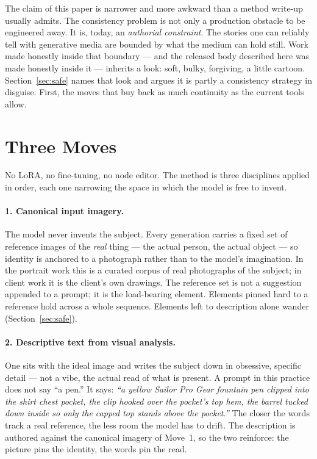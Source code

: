 \documentclass[10pt,letterpaper,twocolumn]{article}
\begin{document}
The claim of this paper is narrower and more awkward than a method write-up
usually admits. The consistency problem is not only a production obstacle
to be engineered away. It is, today, an \emph{authorial constraint}. The
stories one can reliably tell with generative media are bounded by what the
medium can hold still. Work made honestly inside that boundary --- and the
released body described here was made honestly inside it --- inherits a
look: soft, bulky, forgiving, a little cartoon. Section~\ref{sec:safe}
names that look and argues it is partly a consistency strategy in
disguise. First, the moves that buy back as much continuity as the current
tools allow.

\section{Three Moves}
\label{sec:moves}

No LoRA, no fine-tuning, no node editor. The method is three disciplines
applied in order, each one narrowing the space in which the model is free
to invent.

\paragraph{1. Canonical input imagery.} The model never invents the
subject. Every generation carries a fixed set of reference images of the
\emph{real} thing --- the actual person, the actual object --- so identity
is anchored to a photograph rather than to the model's imagination. In the
\ac{} portrait work this is a curated corpus of real photographs of the
subject; in client work it is the client's own drawings. The reference set
is not a suggestion appended to a prompt; it is the load-bearing element.
Elements pinned hard to a reference hold across a whole sequence. Elements
left to description alone wander (Section~\ref{sec:safe}).

\paragraph{2. Descriptive text from visual analysis.} One sits with the
ideal image and writes the subject down in obsessive, specific detail ---
not a vibe, the actual read of what is present. A prompt in this practice
does not say ``a pen.'' It says: \emph{``a yellow Sailor Pro Gear fountain
pen clipped into the shirt chest pocket, the clip hooked over the pocket's
top hem, the barrel tucked down inside so only the capped top stands above
the pocket.''} The closer the words track a real reference, the less room
the model has to drift. The description is authored against the canonical
imagery of Move~1, so the two reinforce: the picture pins the identity, the
words pin the read.
\end{document}
